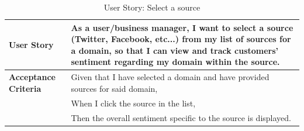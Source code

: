 \documentclass[12pt]{article}
\begin{document}

\begin{table}[htbp]
  \caption{User Story: Select a source}
  \begin{tabular}{|p{}|p{}|}
    \hline
    \textbf{User Story}          & As a user/business manager, I want to select a source (Twitter, Facebook, etc...) from my list of sources for a domain, so that I can view and track customers' sentiment regarding my domain within the source. \\
    \hline
    \textbf{Acceptance Criteria} &
    Given that I have selected a domain and have provided sources for said domain,                                                                                                                                                                  \\
                                 & When I click the source in the list,                                                                                                                                                                             \\
                                 & Then the overall sentiment specific to the source is displayed.                                                                                                                                                  \\
    \hline
  \end{tabular}
\end{table}
\end{document}
